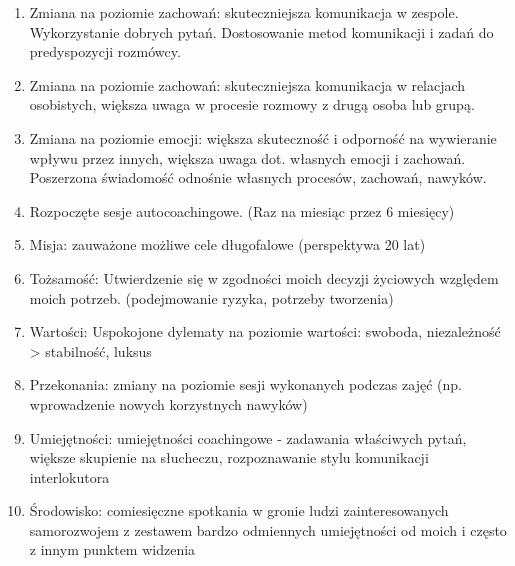 \begin{enumerate}
  \item Zmiana na poziomie zachowań: skuteczniejsza komunikacja w zespole. Wykorzystanie dobrych pytań. Dostosowanie
      metod komunikacji i zadań do predyspozycji rozmówcy.
  \item Zmiana na poziomie zachowań: skuteczniejsza komunikacja w relacjach osobistych, większa uwaga w procesie rozmowy
      z drugą osoba lub grupą.
  \item Zmiana na poziomie emocji: większa skuteczność i odporność na wywieranie wpływu przez innych, większa uwaga dot.
      własnych emocji i zachowań. Poszerzona świadomość odnośnie własnych procesów, zachowań, nawyków.
  \item Rozpoczęte sesje autocoachingowe. (Raz na miesiąc przez 6 miesięcy)
  \item Misja: zauważone możliwe cele długofalowe (perspektywa 20 lat)
  \item Tożsamość: Utwierdzenie się w zgodności moich decyzji życiowych względem moich potrzeb. (podejmowanie ryzyka,
      potrzeby tworzenia)
  \item Wartości: Uspokojone dylematy na poziomie wartości: swoboda, niezależność > stabilność, luksus
  \item Przekonania: zmiany na poziomie sesji wykonanych podczas zajęć (np. wprowadzenie nowych korzystnych nawyków)
  \item Umiejętności: umiejętności coachingowe - zadawania właściwych pytań, większe skupienie na słucheczu, rozpoznawanie
      stylu komunikacji interlokutora
  \item Środowisko: comiesięczne spotkania w gronie ludzi zainteresowanych samorozwojem z zestawem bardzo odmiennych umiejętności od moich
      i często z innym punktem widzenia
\end{enumerate}
